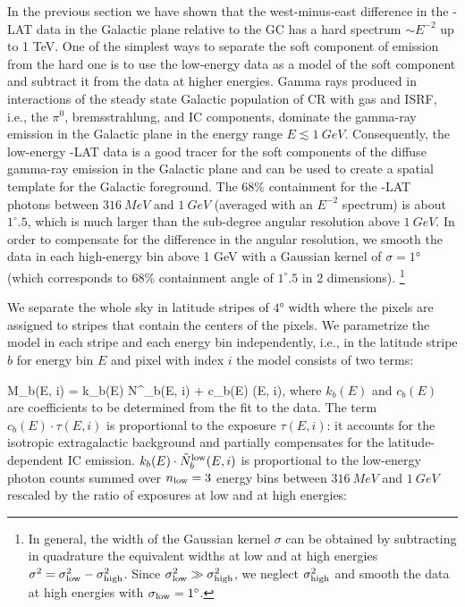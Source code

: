 In the previous section we have shown that the west-minus-east difference in the \Fermi-LAT data in the Galactic plane relative to the GC has a hard 
spectrum $\sim E^{-2}$ up to 1 TeV.
One of the simplest ways to separate the soft component of emission from the hard one is to use the low-energy data as
a model of the soft component and subtract it from the data at higher energies.
Gamma rays produced in interactions of the steady state Galactic population of CR with gas and ISRF,
i.e., the $\pi^0$, bremsstrahlung, and IC components,
dominate the gamma-ray emission in the Galactic plane in the energy range $E \lesssim \SI{1}{GeV}$. 
Consequently, the low-energy \Fermi-LAT data is a good tracer for the soft components of the
diffuse gamma-ray emission in the Galactic plane and can be used to create a spatial template for the Galactic foreground.
The 68\% containment for the \Fermi-LAT photons between $\SI{316}{MeV}$ and $\SI{1}{GeV}$ (averaged with an $E^{-2}$ spectrum) is about $1^\circ\!\!.5$,
which is much larger than the sub-degree angular resolution above $\SI{1}{GeV}$.
In order to compensate for the difference in the angular resolution, 
we smooth the data in each high-energy bin above 1 GeV
with a Gaussian kernel of $\sigma = \ang{1}$ (which corresponds to $68\%$ containment angle of
$1^\circ\!\!.5$ in 2 dimensions).%
\footnote{In general, the width of the Gaussian kernel $\sigma$ can be obtained by subtracting in quadrature
the equivalent widths at low and at high energies $\sigma^2 = \sigma_{\rm low}^2 - \sigma_{\rm high}^2$.
Since $\sigma_{\rm low}^2 \gg \sigma_{\rm high}^2$, we neglect $\sigma_{\rm high}^2$ and smooth the 
data at high energies with $\sigma_{\rm low} = 1^\circ$.}

We separate the whole sky in latitude stripes of $\ang{4}$ width where the \Healpix pixels are assigned to stripes that contain the centers of the pixels.
We parametrize the model in each stripe and each energy bin independently, i.e., 
in the latitude stripe $b$ for energy bin $E$ and \Healpix pixel with index $i$ the model consists of two terms:

\be
{}
M_{b}(E, i) = k_{b}(E) \cdot \tilde N^\low_{b}(E, i) + c_b(E) \cdot \tau(E, i),
\ee
where $k_{b}(E)$ and $c_b(E)$ are coefficients to be determined from the fit to the data.
The term $c_b(E) \cdot \tau(E, i)$ is proportional to the exposure $\tau(E, i)$: it accounts for the isotropic extragalactic background and partially compensates for 
the latitude-dependent IC emission.
$k_{b}(E) \cdot \tilde N^{\text{low}}_b(E, i)$ is proportional to the low-energy photon counts summed over 
$n_{\text{low}} = 3$ energy bins between $\SI{316}{MeV}$ and $\SI{1}{GeV}$ 
rescaled by the ratio of exposures at low and at high energies:

